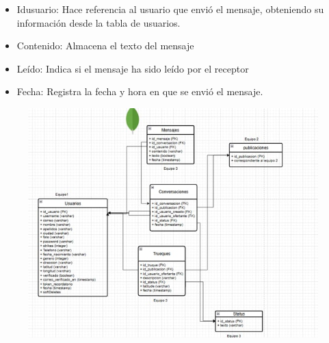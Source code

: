 \documentclass[11pt, a4paper, oneside]{book}
\begin{document}
\begin{itemize}
\begin{enumerate}
\begin{itemize}
\end{itemize} 

\begin{itemize} 

    \item Idusuario: Hace referencia al usuario que envió el mensaje, obteniendo su información desde la tabla de usuarios. 

\end{itemize} 

\begin{itemize} 

    \item Contenido: Almacena el texto del mensaje 

\end{itemize} 

\begin{itemize} 

    \item Leído: Indica si el mensaje ha sido leído por el receptor 

\end{itemize} 

\begin{itemize} 

    \item Fecha: Registra la fecha y hora en que se envió el mensaje. 

\end{itemize} 

\end{enumerate} 

 

\begin{figure}[h!] 

\centering 

\includegraphics[width=\textwidth]{Pictures/tabalteam3.jpg} 


\end{figure}
\end{itemize}
\end{document}
